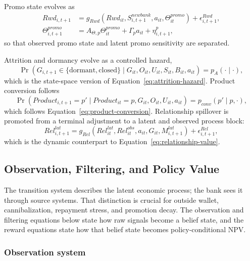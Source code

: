 \documentclass[11pt]{article}
\newcommand{\1}{\mathbf{1}}
\begin{document}
Promo state evolves as
\begin{align}
  Rwd_{i,t+1}
    &= g_{Rwd}(Rwd_{it},S^{newbank}_{i,t+1},a_{it},\Theta^{promo}_{it})
       + \epsilon^{Rwd}_{i,t+1},
       \label{eq:ss-reward-transition}\\
  \Theta^{promo}_{i,t+1}
    &= A_{\Theta,p}\Theta^{promo}_{it} + \Gamma_p a_{it} + \eta^p_{i,t+1},
       \label{eq:ss-promo-latent}
\end{align}
so that observed promo state and latent promo sensitivity are separated.

Attrition and dormancy evolve as a controlled hazard,
\begin{equation}
  \Pr(G_{i,t+1}\in\{\mathrm{dormant},\mathrm{closed}\}
  \mid G_{it},O_{it},U_{it},S_{it},B_{it},a_{it})
  = p_A(\cdot\mid\cdot),
  \label{eq:ss-attrition-transition}
\end{equation}
which is the state-space version of Equation~\eqref{eq:attrition-hazard}.
Product conversion follows
\begin{equation}
  \Pr(Product_{i,t+1}=p'\mid Product_{it}=p,G_{it},O_{it},U_{it},a_{it})
  = p_{conv}(p'\mid p,\cdot),
  \label{eq:ss-conversion-transition}
\end{equation}
which follows Equation~\eqref{eq:product-conversion}. Relationship spillover is
promoted from a terminal adjustment to a latent and observed process block:
\begin{equation}
  Rel^{lat}_{i,t+1}
  =
  g_{Rel}(Rel^{lat}_{it},Rel^{obs}_{it},a_{it},G_{it},M^{lat}_{i,t+1})
  + \epsilon^{Rel}_{i,t+1},
  \label{eq:ss-relationship-transition}
\end{equation}
which is the dynamic counterpart to Equation~\eqref{eq:relationship-value}.

\subsection{Observation, Filtering, and Policy Value}

The transition system describes the latent economic process; the bank sees it
through source systems. That distinction is crucial for outside wallet,
cannibalization, repayment stress, and promotion decay. The observation and
filtering equations below state how raw signals become a belief state, and the
reward equations state how that belief state becomes policy-conditional NPV.

\subsubsection{Observation system}
\label{subsec:state-space-observations}
\end{document}
